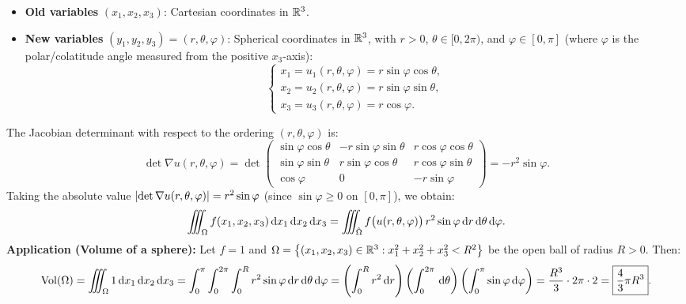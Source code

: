 \begin{exemple}
\begin{itemize}
    \item \textbf{Old variables} $(x_1, x_2, x_3)$: Cartesian coordinates in $\mathbb{R}^3$.
    \item \textbf{New variables} $(y_1, y_2, y_3) = (r, \theta, \varphi)$: Spherical coordinates in $\mathbb{R}^3$, with $r > 0$, $\theta \in [0, 2\pi)$, and $\varphi \in [0, \pi]$ (where $\varphi$ is the polar/colatitude angle measured from the positive $x_3$-axis):
    \[
        \begin{cases}
            x_1 = u_1(r, \theta, \varphi) = r \sin\varphi \cos\theta, \\
            x_2 = u_2(r, \theta, \varphi) = r \sin\varphi \sin\theta, \\
            x_3 = u_3(r, \theta, \varphi) = r \cos\varphi.
        \end{cases}
    \]
\end{itemize}
The Jacobian determinant with respect to the ordering $(r, \theta, \varphi)$ is:
\[
    \det \nabla u(r, \theta, \varphi) = \det \begin{pmatrix}
        \sin\varphi \cos\theta & -r \sin\varphi \sin\theta & r \cos\varphi \cos\theta \\
        \sin\varphi \sin\theta & r \sin\varphi \cos\theta & r \cos\varphi \sin\theta \\
        \cos\varphi & 0 & -r \sin\varphi
    \end{pmatrix} = -r^2 \sin\varphi.
\]
Taking the absolute value $\left\lvert\det \nabla u(r, \theta, \varphi)\right\rvert = r^2 \sin\varphi$ (since $\sin\varphi \ge 0$ on $[0, \pi]$), we obtain:
\[
    \iiint_{\Omega} f(x_1, x_2, x_3) \,\mathrm{d}x_1\,\mathrm{d}x_2\,\mathrm{d}x_3 = \iiint_{\hat{\Omega}} f\big(u(r, \theta, \varphi)\big) \, r^2 \sin\varphi \,\mathrm{d}r\,\mathrm{d}\theta\,\mathrm{d}\varphi.
\]
\textbf{Application (Volume of a sphere):} Let $f = 1$ and $\Omega = \left\{(x_1, x_2, x_3) \in \mathbb{R}^3 : x_1^2 + x_2^2 + x_3^2 < R^2\right\}$ be the open ball of radius $R > 0$. Then:
\[
    \operatorname{Vol}(\Omega) = \iiint_{\Omega} 1 \,\mathrm{d}x_1\,\mathrm{d}x_2\,\mathrm{d}x_3 = \int_{0}^{\pi} \int_{0}^{2\pi} \int_{0}^{R} r^2 \sin\varphi \,\mathrm{d}r\,\mathrm{d}\theta\,\mathrm{d}\varphi = \left( \int_{0}^{R} r^2 \,\mathrm{d}r \right) \left( \int_{0}^{2\pi} \,\mathrm{d}\theta \right) \left( \int_{0}^{\pi} \sin\varphi \,\mathrm{d}\varphi \right) = \frac{R^3}{3} \cdot 2\pi \cdot 2 = \boxed{\frac{4}{3} \pi R^3}.
\]
\end{exemple}

